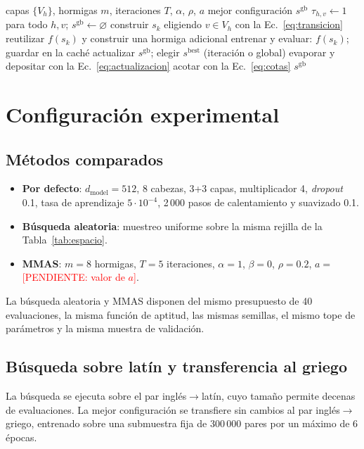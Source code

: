 \documentclass[conference]{IEEEtran}
\newcommand{\pendiente}[1]{\textcolor{red}{[PENDIENTE: #1]}}
\begin{document}
\begin{algorithm}[t]
\caption{MMAS para el ajuste de hiperparámetros}
\label{alg:mmas}
\begin{algorithmic}[1]
\Require capas $\{V_h\}$, hormigas $m$, iteraciones $T$, $\alpha$, $\rho$, $a$
\Ensure mejor configuración $s^{\text{gb}}$
\State $\tau_{h,v} \gets 1$ para todo $h, v$; \quad $s^{\text{gb}} \gets \varnothing$
    \State construir $s_k$ eligiendo $v \in V_h$ con la Ec.~\eqref{eq:transicion}
       \State reutilizar $f(s_k)$ y construir una hormiga adicional
    \Else
       \State entrenar y evaluar: $f(s_k)$; guardar en la caché
    \EndIf
  \EndFor
  \State actualizar $s^{\text{gb}}$; elegir $s^{\text{best}}$ (iteración o global)
  \State evaporar y depositar con la Ec.~\eqref{eq:actualizacion}
  \State acotar con la Ec.~\eqref{eq:cotas}
\EndFor
\State \Return $s^{\text{gb}}$
\end{algorithmic}
\end{algorithm}

\section{Configuración experimental}

\subsection{Métodos comparados}
\begin{itemize}
  \item \textbf{Por defecto}: $d_\text{model}=512$, 8 cabezas, 3+3 capas,
  multiplicador 4, \emph{dropout} 0.1, tasa de aprendizaje
  $5{\cdot}10^{-4}$, 2\,000 pasos de calentamiento y suavizado 0.1.
  \item \textbf{Búsqueda aleatoria}: muestreo uniforme sobre la misma
  rejilla de la Tabla~\ref{tab:espacio}.
  \item \textbf{MMAS}: $m = 8$ hormigas, $T = 5$ iteraciones,
  $\alpha = 1$, $\beta = 0$, $\rho = 0.2$, $a = $ \pendiente{valor de $a$}.
\end{itemize}
La búsqueda aleatoria y MMAS disponen del mismo presupuesto de 40
evaluaciones, la misma función de aptitud, las mismas semillas, el mismo
tope de parámetros y la misma muestra de validación.

\subsection{Búsqueda sobre latín y transferencia al griego}
La búsqueda se ejecuta sobre el par inglés$\to$latín, cuyo tamaño permite
decenas de evaluaciones. La mejor configuración se transfiere sin cambios
al par inglés$\to$griego, entrenado sobre una submuestra fija de 300\,000
pares por un máximo de 6 épocas.
\end{document}
